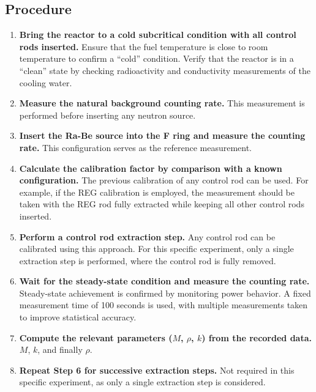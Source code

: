 \subsection{Procedure}

\begin{enumerate}
    \item \textbf{Bring the reactor to a cold subcritical condition with all control rods inserted.}  
    Ensure that the fuel temperature is close to room temperature to confirm a ``cold'' condition.  
    Verify that the reactor is in a ``clean'' state by checking radioactivity and conductivity measurements of the cooling water.

    \item \textbf{Measure the natural background counting rate.}  
    This measurement is performed before inserting any neutron source.

    \item \textbf{Insert the Ra-Be source into the F ring and measure the counting rate.}  
    This configuration serves as the reference measurement.

    \item \textbf{Calculate the calibration factor by comparison with a known configuration.}  
    The previous calibration of any control rod can be used. For example, if the REG calibration is employed, the measurement should be taken with the REG rod fully extracted while keeping all other control rods inserted.

    \item \textbf{Perform a control rod extraction step.}  
    Any control rod can be calibrated using this approach. For this specific experiment, only a single extraction step is performed, where the control rod is fully removed.

    \item \textbf{Wait for the steady-state condition and measure the counting rate.}  
    Steady-state achievement is confirmed by monitoring power behavior.  
    A fixed measurement time of 100 seconds is used, with multiple measurements taken to improve statistical accuracy.

    \item \textbf{Compute the relevant parameters ($M$, $\rho$, $k$) from the recorded data.} $M$, $k$, and finally $\rho$.

    \item \textbf{Repeat Step 6 for successive extraction steps.}  
    Not required in this specific experiment, as only a single extraction step is considered.
\end{enumerate}


